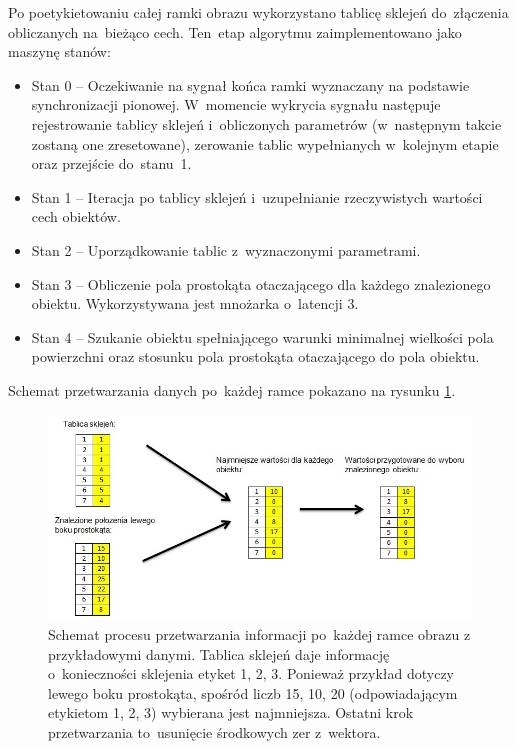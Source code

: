 Po poetykietowaniu całej ramki obrazu wykorzystano tablicę sklejeń do~złączenia obliczanych na~bieżąco cech. 
Ten~etap algorytmu zaimplementowano jako maszynę stanów:
\begin{itemize}
	\item Stan 0 -- Oczekiwanie na sygnał końca ramki wyznaczany na podstawie synchronizacji pionowej. W~momencie wykrycia sygnału następuje rejestrowanie tablicy sklejeń i~obliczonych parametrów (w~następnym takcie zostaną one zresetowane), zerowanie tablic wypełnianych w~kolejnym etapie oraz przejście do~stanu~1. %
	\item Stan 1 -- Iteracja po tablicy sklejeń i~uzupełnianie rzeczywistych wartości cech obiektów.
	\item Stan 2 -- Uporządkowanie tablic z~wyznaczonymi parametrami.
	\item Stan 3 -- Obliczenie pola prostokąta otaczającego dla każdego znalezionego obiektu. Wykorzystywana jest mnożarka o~latencji 3.
	\item Stan 4 -- Szukanie obiektu spełniającego warunki minimalnej wielkości pola powierzchni oraz stosunku pola prostokąta otaczającego do pola obiektu.
\end{itemize}
Schemat przetwarzania danych po~każdej ramce pokazano na rysunku \ref{fig:ind_schemat}.\\
\begin{figure}[h]
	\centering
	\includegraphics[width=\textwidth]{ind_schemat.jpg}
	\caption{Schemat procesu przetwarzania informacji po~każdej ramce obrazu z przykładowymi danymi. Tablica sklejeń daje informację o~konieczności sklejenia etyket 1, 2, 3. Ponieważ przykład dotyczy lewego boku prostokąta, spośród liczb 15, 10, 20 (odpowiadającym etykietom 1, 2, 3) wybierana jest najmniejsza. Ostatni krok przetwarzania to~usunięcie środkowych zer z~wektora.}
	\label{fig:ind_schemat}
\end{figure}

